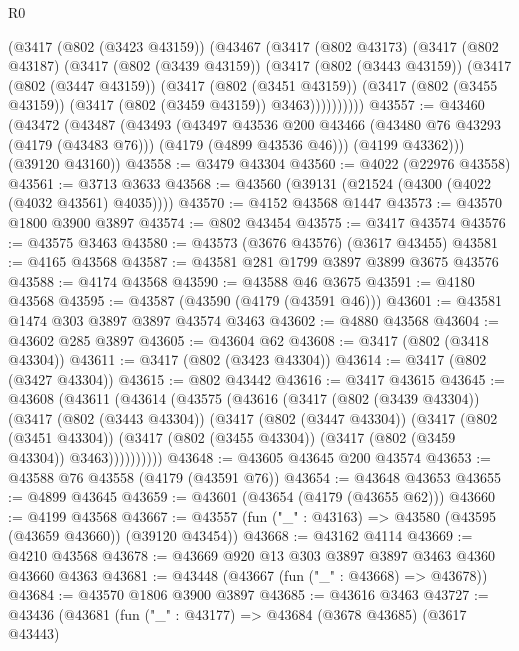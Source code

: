 \begin{lexlean}{R0}
\begin{coremodule}
    (@3417
      (@802 (@3423 @43159))
      (@43467
        (@3417
          (@802 @43173)
          (@3417
            (@802 @43187)
            (@3417
              (@802 (@3439 @43159))
              (@3417
                (@802 (@3443 @43159))
                (@3417
                  (@802 (@3447 @43159))
                  (@3417
                    (@802 (@3451 @43159))
                    (@3417 (@802 (@3455 @43159)) (@3417 (@802 (@3459 @43159)) @3463))))))))))
@43557 := @43460
    (@43472
      (@43487
        (@43493
          (@43497
            @43536
            @200
            @43466
            (@43480 @76 @43293 (@4179 (@43483 @76)))
            (@4179 (@4899 @43536 @46)))
          (@4199 @43362)))
      (@39120 @43160))
@43558 := @3479 @43304
@43560 := @4022 (@22976 @43558)
@43561 := @3713 @3633
@43568 := @43560 (@39131 (@21524 (@4300 (@4022 (@4032 @43561) @4035))))
@43570 := @4152 @43568 @1447
@43573 := @43570 @1800 @3900 @3897
@43574 := @802 @43454
@43575 := @3417 @43574
@43576 := @43575 @3463
@43580 := @43573 (@3676 @43576) (@3617 @43455)
@43581 := @4165 @43568
@43587 := @43581 @281 @1799 @3897 @3899 @3675 @43576
@43588 := @4174 @43568
@43590 := @43588 @46 @3675
@43591 := @4180 @43568
@43595 := @43587 (@43590 (@4179 (@43591 @46)))
@43601 := @43581 @1474 @303 @3897 @3897 @43574 @3463
@43602 := @4880 @43568
@43604 := @43602 @285 @3897
@43605 := @43604 @62
@43608 := @3417 (@802 (@3418 @43304))
@43611 := @3417 (@802 (@3423 @43304))
@43614 := @3417 (@802 (@3427 @43304))
@43615 := @802 @43442
@43616 := @3417 @43615
@43645 := @43608
    (@43611
      (@43614
        (@43575
          (@43616
            (@3417
              (@802 (@3439 @43304))
              (@3417
                (@802 (@3443 @43304))
                (@3417
                  (@802 (@3447 @43304))
                  (@3417
                    (@802 (@3451 @43304))
                    (@3417 (@802 (@3455 @43304)) (@3417 (@802 (@3459 @43304)) @3463))))))))))
@43648 := @43605 @43645 @200 @43574
@43653 := @43588 @76 @43558 (@4179 (@43591 @76))
@43654 := @43648 @43653
@43655 := @4899 @43645
@43659 := @43601 (@43654 (@4179 (@43655 @62)))
@43660 := @4199 @43568
@43667 := @43557 (fun ("_" : @43163) => @43580 (@43595 (@43659 @43660)) (@39120 @43454))
@43668 := @43162 @4114
@43669 := @4210 @43568
@43678 := @43669 @920 @13 @303 @3897 @3897 @3463 @4360 @43660 @4363
@43681 := @43448 (@43667 (fun ("_" : @43668) => @43678))
@43684 := @43570 @1806 @3900 @3897
@43685 := @43616 @3463
@43727 := @43436
    (@43681
      (fun ("_" : @43177) =>
      @43684
        (@3678 @43685)
        (@3617 @43443)

\end{coremodule}
\end{lexlean}
